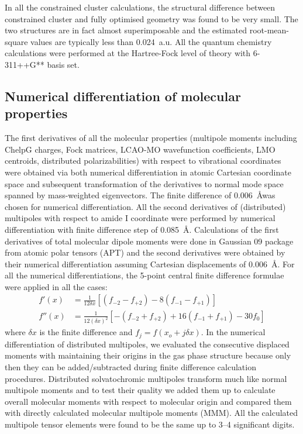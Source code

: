 \documentclass[a4paper,titlepage,twoside,fleqn,12pt]{book}
\begin{document}
\begin{appendices}
\begin{refsection}
In all the constrained cluster calculations, the
structural difference between constrained cluster and fully
optimised geometry was found to be very small. The two
structures are in fact almost superimposable and the estimated
root\hyp{}mean\hyp{}square values are typically less than 0.024~a.u. 
All the quantum chemistry calculations were performed
at the Hartree\hyp{}Fock level of theory \citep{Roothaan.RevModPhys.1951} 
with 6-311++G** basis
set. \citep{Krishnan.Binkley.Seeger.Pople.JCP.1980,
McLean.Chandler.JCP.1980}

\subsection{Numerical differentiation of molecular properties}

The first derivatives of all the molecular properties
(multipole moments including ChelpG charges, Fock matrices, LCAO\hyp{}MO
wavefunction coefficients, LMO centroids, distributed polarizabilities)
with respect to
vibrational coordinates were obtained via both numerical differentiation
in atomic Cartesian coordinate space and subsequent
transformation of the derivatives to normal mode space
spanned by mass\hyp{}weighted eigenvectors. The finite difference
of 0.006~\AA was chosen for numerical differentiation. All the
second derivatives of (distributed) multipoles with respect to
amide I coordinate were performed by numerical differentiation
with finite difference step of 0.085~\AA. Calculations
of the first derivatives of total molecular dipole moments
were done in {\sc Gaussian 09} package from atomic polar
tensors (APT) and the second derivatives were obtained by
their numerical differentiation assuming Cartesian displacements
of 0.006~\AA. For all the numerical differentiations, the
5\hyp{}point central finite difference formulae were applied in all the
cases:
%
\begin{subequations}
 \begin{align}
   f'(x) &= \frac{1}{12\delta x} \left[
 \left( f_{-2} - f_{+2} \right) - 
8\left( f_{-1} - f_{+1} \right)
\right] \\
  f''(x) &= \frac{1}{12(\delta x)^2} \left[
 -\left( f_{-2} + f_{+2} \right) + 
16\left( f_{-1} + f_{+1} \right) - 30f_0
\right]
 \end{align}
\end{subequations}
%
where $\delta x$ is the finite difference and $f_j = f(x_o + j\delta x)$. 
In the
numerical differentiation of distributed multipoles, we evaluated
the consecutive displaced moments with maintaining
their origins in the gas phase structure because only then they
can be added/subtracted during finite difference calculation
procedures. Distributed solvatochromic multipoles transform
much like normal multipole moments and to test their quality
we added them up to calculate overall molecular moments
with respect to molecular origin and compared them with directly
calculated molecular multipole moments (MMM). All
the calculated multipole tensor elements were found to be the
same up to 3--4 significant digits.


\end{refsection}
\end{appendices}
\end{document}
